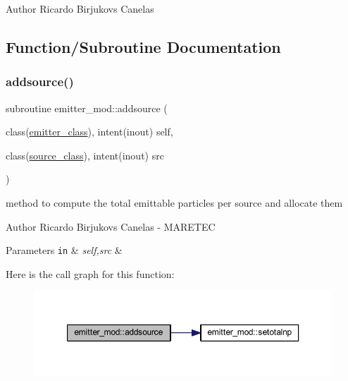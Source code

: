 \begin{DoxyAuthor}{Author}
Ricardo Birjukovs Canelas 
\end{DoxyAuthor}


\subsection{Function/\+Subroutine Documentation}
\mbox{\label{namespaceemitter__mod_ab704fb0e2eb9b3b4b9542706b6fb4eaf}} 
\subsubsection{\texorpdfstring{addsource()}{addsource()}}
{\footnotesize\ttfamily subroutine emitter\+\_\+mod\+::addsource (\begin{DoxyParamCaption}\item[{class(\hyperlink{structemitter__mod_1_1emitter__class}{emitter\+\_\+class}), intent(inout)}]{self,  }\item[{class(\hyperlink{structsources__mod_1_1source__class}{source\+\_\+class}), intent(inout)}]{src }\end{DoxyParamCaption})\hspace{0.3cm}{\ttfamily [private]}}



method to compute the total emittable particles per source and allocate them 

\begin{DoxyAuthor}{Author}
Ricardo Birjukovs Canelas -\/ M\+A\+R\+E\+T\+EC 
\end{DoxyAuthor}

\begin{DoxyParams}[1]{Parameters}
\mbox{\tt in}  & {\em self,src} & \\
\hline
\end{DoxyParams}
Here is the call graph for this function\+:\nopagebreak
\begin{figure}[H]
\begin{center}
\leavevmode
\includegraphics[width=350pt]{namespaceemitter__mod_ab704fb0e2eb9b3b4b9542706b6fb4eaf_cgraph}
\end{center}
\end{figure}
\mbox{\label{namespaceemitter__mod_a7c677125988390e4c57909e4ea82d902}} 
